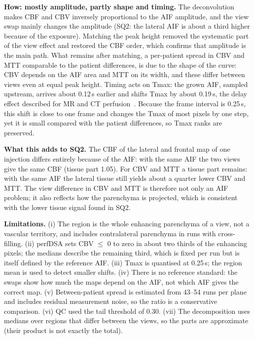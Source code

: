 \textbf{How: mostly amplitude, partly shape and timing.} The deconvolution makes CBF and CBV inversely proportional to
the AIF amplitude, and the view swap mainly changes the amplitude (SQ2: the lateral AIF is about a third higher because
of the exposure). Matching the peak height removed the systematic part of the view effect and restored the CBF order,
which confirms that amplitude is the main path. What remains after matching, a per-patient spread in CBV and MTT
comparable to the patient differences, is due to the shape of the curve: CBV depends on the AIF area and MTT on its
width, and these differ between views even at equal peak height. Timing acts on Tmax: the grown AIF, sampled upstream,
arrives about 0.12\,s earlier and shifts Tmax by about 0.19\,s, the delay effect described for MR and CT
perfusion~\cite{calamante2000}. Because the frame interval is 0.25\,s, this shift is close to one frame and changes the
Tmax of most pixels by one step, yet it is small compared with the patient differences, so Tmax ranks are preserved.

\textbf{What this adds to SQ2.} The CBF of the lateral and frontal map of one injection differs entirely because of
the AIF: with the same AIF the two views give the same CBF (tissue part 1.05). For CBV and MTT a tissue part remains:
with the same AIF the lateral tissue still yields about a quarter lower CBV and MTT. The view difference in CBV and MTT is
therefore not only an AIF problem; it also reflects how the parenchyma is projected, which is consistent with the lower
tissue signal found in SQ2.

\textbf{Limitations.} (i) The region is the whole enhancing parenchyma of a view, not a vascular territory, and
includes contralateral parenchyma in runs with cross-filling. (ii) perfDSA sets CBV $\leq$ 0 to zero in about two thirds
of the enhancing pixels; the medians describe the remaining third, which is fixed per run but is itself defined by the
reference AIF. (iii) Tmax is quantised at 0.25\,s; the region mean is used to detect smaller shifts. (iv) There is no
reference standard: the swaps show how much the maps depend on the AIF, not which AIF gives the correct map. (v)
Between-patient spread is estimated from 43--54 runs per plane and includes residual measurement noise, so the ratio is
a conservative comparison. (vi) QC used the tail threshold of 0.30. (vii) The decomposition uses medians over regions
that differ between the views, so the parts are approximate (their product is not exactly the total).

